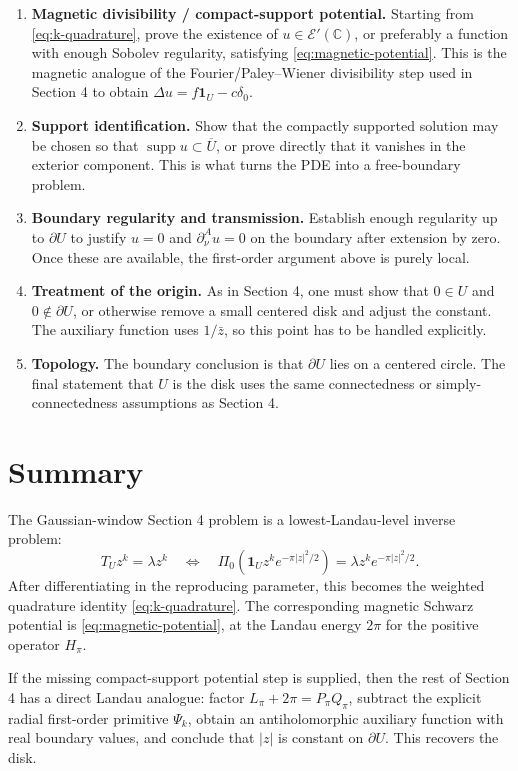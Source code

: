 \documentclass[11pt]{article}
\newcommand{\C}{\mathbb C}
\newcommand{\1}{\mathbf 1}
\begin{document}
\begin{enumerate}
    \item \textbf{Magnetic divisibility / compact-support potential.}
    Starting from \eqref{eq:k-quadrature}, prove the existence of
    \(u\in\mathcal E'(\C)\), or preferably a function with enough Sobolev
    regularity, satisfying \eqref{eq:magnetic-potential}.  This is the magnetic
    analogue of the Fourier/Paley--Wiener divisibility step used in Section 4
    to obtain \(\Delta u=f\1_U-c\delta_0\).

    \item \textbf{Support identification.}
    Show that the compactly supported solution may be chosen so that
    \(\operatorname{supp}u\subset\overline U\), or prove directly that it
    vanishes in the exterior component.  This is what turns the PDE into a
    free-boundary problem.

    \item \textbf{Boundary regularity and transmission.}
    Establish enough regularity up to \(\partial U\) to justify
    \(u=0\) and \(\partial_\nu^A u=0\) on the boundary after extension by zero.
    Once these are available, the first-order argument above is purely local.

    \item \textbf{Treatment of the origin.}
    As in Section 4, one must show that \(0\in U\) and \(0\notin\partial U\),
    or otherwise remove a small centered disk and adjust the constant.  The
    auxiliary function uses \(1/\bar z\), so this point has to be handled
    explicitly.

    \item \textbf{Topology.}
    The boundary conclusion is that \(\partial U\) lies on a centered circle.
    The final statement that \(U\) is the disk uses the same connectedness or
    simply-connectedness assumptions as Section 4.
\end{enumerate}

\section{Summary}

The Gaussian-window Section 4 problem is a lowest-Landau-level inverse problem:
\[
        T_U z^k=\lambda z^k
        \quad\Longleftrightarrow\quad
        \Pi_0(\1_U z^k e^{-\pi |z|^2/2})
        =
        \lambda z^k e^{-\pi |z|^2/2}.
\]
After differentiating in the reproducing parameter, this becomes the weighted
quadrature identity \eqref{eq:k-quadrature}.  The corresponding magnetic
Schwarz potential is \eqref{eq:magnetic-potential}, at the Landau energy
\(2\pi\) for the positive operator \(H_\pi\).

If the missing compact-support potential step is supplied, then the rest of
Section 4 has a direct Landau analogue: factor \(L_\pi+2\pi=P_\pi Q_\pi\),
subtract the explicit radial first-order primitive \(\Psi_k\), obtain an
antiholomorphic auxiliary function with real boundary values, and conclude that
\(|z|\) is constant on \(\partial U\).  This recovers the disk.
\end{document}

